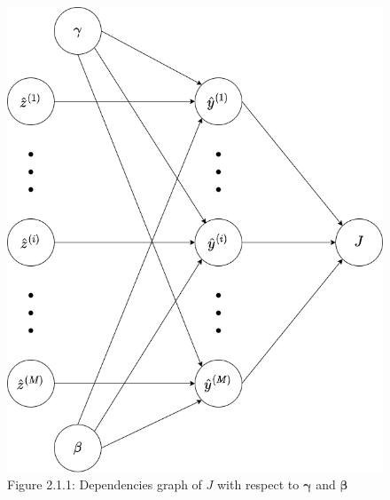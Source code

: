 \documentclass{article}
\begin{document}
\begin{figure}[!ht]
    \captionsetup{labelformat=empty}
    \centering
    \includegraphics[scale=0.4]{Dependencies graph with beta gamma.drawio.png}
    \caption{Figure 2.1.1: Dependencies graph of $J$ with respect to $\boldsymbol{\gamma}$ and $\boldsymbol{\beta}$}  
\end{figure}
\end{document}
